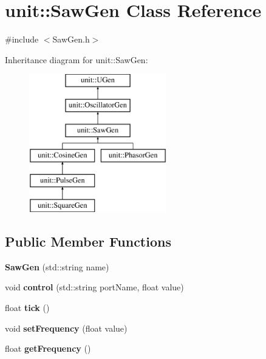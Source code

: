 \hypertarget{classunit_1_1SawGen}{\section{unit\-:\-:Saw\-Gen Class Reference}
\label{classunit_1_1SawGen}
}


{\ttfamily \#include $<$Saw\-Gen.\-h$>$}

Inheritance diagram for unit\-:\-:Saw\-Gen\-:\begin{figure}[H]
\begin{center}
\leavevmode
\includegraphics[height=6.000000cm]{classunit_1_1SawGen}
\end{center}
\end{figure}
\subsection*{Public Member Functions}
\begin{DoxyCompactItemize}
\item 
\hypertarget{classunit_1_1SawGen_a24c35afc1bdb237a8a5d1eb3888ce0bc}{{\bfseries Saw\-Gen} (std\-::string name)}\label{classunit_1_1SawGen_a24c35afc1bdb237a8a5d1eb3888ce0bc}

\item 
\hypertarget{classunit_1_1SawGen_a515f6eb82a1a97ee434144b8c58133b8}{void {\bfseries control} (std\-::string port\-Name, float value)}\label{classunit_1_1SawGen_a515f6eb82a1a97ee434144b8c58133b8}

\item 
\hypertarget{classunit_1_1SawGen_a18c6704aec8f20a5605ff72d674c7516}{float {\bfseries tick} ()}\label{classunit_1_1SawGen_a18c6704aec8f20a5605ff72d674c7516}

\item 
\hypertarget{classunit_1_1SawGen_a1a77058c93e7f7b3fe4b355953674678}{void {\bfseries set\-Frequency} (float value)}\label{classunit_1_1SawGen_a1a77058c93e7f7b3fe4b355953674678}

\item 
\hypertarget{classunit_1_1SawGen_a0f08973bebb28aa1a059ccce09e5ebdf}{float {\bfseries get\-Frequency} ()}\label{classunit_1_1SawGen_a0f08973bebb28aa1a059ccce09e5ebdf}

\end{DoxyCompactItemize}
